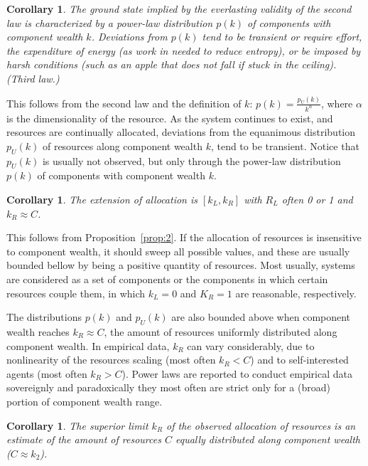 \documentclass[a4paper, 11pt]{article} %
\newtheorem{corollary}[theorem2]{Corollary}
\begin{document}
\begin{corollary}\label{prop:3}
	The ground state implied by the everlasting validity of the second law is characterized by
	a power-law distribution $p(k)$ of components with component wealth $k$. Deviations from $p(k)$ tend to be transient or require effort, the expenditure of energy (as work in needed to reduce entropy), or be imposed by harsh conditions (such as an apple that does not fall if stuck in the ceiling). (Third law.)
\end{corollary}

This follows from the second law and the definition of $k$:
$p(k)=\frac{p_U(k)}{k^\alpha}$, where $\alpha$ is
the dimensionality of the resource.
As the system continues to exist,
and resources are continually allocated, deviations from the equanimous
distribution $p_U(k)$ of resources along component wealth $k$,
 tend to be transient.
 Notice that $p_U(k)$ is usually not observed, but only through 
 the power-law distribution $p(k)$ of components
with component wealth $k$.

\begin{corollary}
	The extension of allocation is $[k_L,k_R]$ with $R_L$ often 0 or 1 and $k_R\approx C$.
\end{corollary}

This follows from Proposition~\ref{prop:2}.
If the allocation of resources is insensitive to component wealth,
it should sweep all possible values, and these are usually
bounded bellow by being a positive quantity of resources.
Most usually, systems are considered as a set of components
or the components in which certain resources couple them,
in which $k_L=0$ and $K_R=1$ are reasonable, respectively.

The distributions $p(k)$ and $p_U(k)$ are also
bounded above when component wealth reaches $k_R \approx C$,
the amount of resources uniformly distributed along component wealth.
In empirical data, $k_R$ can vary considerably, due to
nonlinearity of the resources scaling (most often $k_R<C$) and
to self-interested agents (most often $k_R>C$).
Power laws are reported to conduct empirical data sovereignly and
paradoxically they most often are strict only for a
(broad) portion of component wealth range.


\begin{corollary}
	The superior limit $k_R$ of the observed allocation of resources is an estimate of the amount of resources $C$ equally distributed along component wealth ($C\approx k_2$).
\end{corollary}
\end{document}
